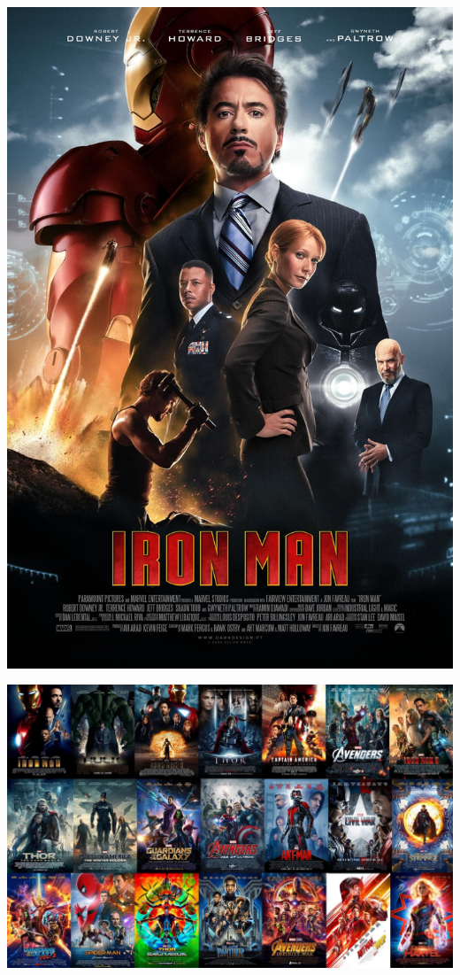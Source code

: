 \documentclass{beamer}
\begin{document}
\begin{frame}
    \begin{minipage}{.4\textwidth}
        \includegraphics[width=.75\textwidth]{static/iron_man_2008.jpg}
    \end{minipage} \pause
    \begin{minipage}{.58\textwidth}
        \includegraphics[width=\textwidth]{static/MCU.jpg}
    \end{minipage}
\end{frame}
\end{document}
